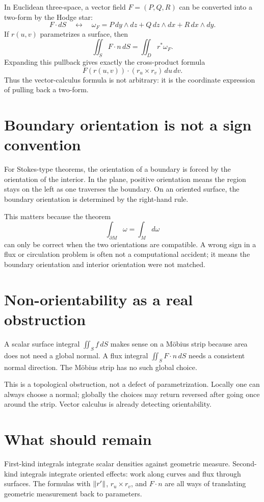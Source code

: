 In Euclidean three-space, a vector field \(F=(P,Q,R)\) can be converted into a two-form by the Hodge star:
\[
  F\cdot dS
  \quad\longleftrightarrow\quad
  \omega_F=P\,dy\wedge dz+Q\,dz\wedge dx+R\,dx\wedge dy.
\]
If \(r(u,v)\) parametrizes a surface, then
\[
  \iint_S F\cdot n\,dS=\iint_D r^*\omega_F.
\]
Expanding this pullback gives exactly the cross-product formula
\[
  F(r(u,v))\cdot(r_u\times r_v)\,du\,dv.
\]
Thus the vector-calculus formula is not arbitrary: it is the coordinate expression of pulling back a two-form.

\section{Boundary orientation is not a sign convention}

For Stokes-type theorems, the orientation of a boundary is forced by the orientation of the interior.  In the plane, positive orientation means the region stays on the left as one traverses the boundary.  On an oriented surface, the boundary orientation is determined by the right-hand rule.

This matters because the theorem
\[
  \int_{\partial M}\omega=\int_M d\omega
\]
can only be correct when the two orientations are compatible.  A wrong sign in a flux or circulation problem is often not a computational accident; it means the boundary orientation and interior orientation were not matched.

\section{Non-orientability as a real obstruction}

A scalar surface integral \(\iint_S f\,dS\) makes sense on a Möbius strip because area does not need a global normal.  A flux integral \(\iint_S F\cdot n\,dS\) needs a consistent normal direction.  The Möbius strip has no such global choice.

This is a topological obstruction, not a defect of parametrization.  Locally one can always choose a normal; globally the choices may return reversed after going once around the strip.  Vector calculus is already detecting orientability.

\section{What should remain}

First-kind integrals integrate scalar densities against geometric measure.  Second-kind integrals integrate oriented effects: work along curves and flux through surfaces.  The formulas with \(\left\lVert r' \right\rVert\), \(r_u\times r_v\), and \(F\cdot n\) are all ways of translating geometric measurement back to parameters.
